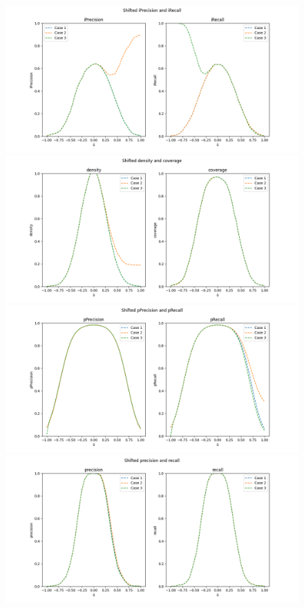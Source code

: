 \begin{figure}[h!]
    \centering
    \includegraphics[width=\linewidth]{../images/toyexperiments/outliers/shift_iPrecision_iRecall.png} 
    \includegraphics[width=\linewidth]{../images/toyexperiments/outliers/shift_density_coverage.png} 
    \includegraphics[width=\linewidth]{../images/toyexperiments/outliers/shift_pPrecision_pRecall.png} 
    \includegraphics[width=\linewidth]{../images/toyexperiments/outliers/shift_precision_recall.png} 
\end{figure}

